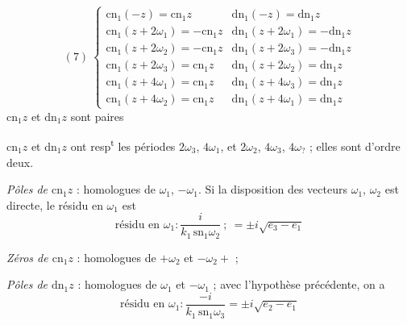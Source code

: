 \documentclass[11pt,a4paper]{article}
\begin{document}
\[
(7)\ \left\lbrace
\begin{array}{ll}
\mathrm{cn}_1(-z) = \mathrm{cn}_1 z & \mathrm{dn}_1(-z) = \mathrm{dn}_1 z\\[4pt]
\mathrm{cn}_1(z+2\omega_1) = -\mathrm{cn}_1 z & \mathrm{dn}_1(z+2\omega_1) = -\mathrm{dn}_1 z\\
\mathrm{cn}_1(z+2\omega_2) = -\mathrm{cn}_1 z & \mathrm{dn}_1(z+2\omega_3) = -\mathrm{dn}_1 z\\[4pt]
\mathrm{cn}_1(z+2\omega_3) = \mathrm{cn}_1 z & \mathrm{dn}_1(z+2\omega_2) = \mathrm{dn}_1 z\\
\mathrm{cn}_1(z+4\omega_1) = \mathrm{cn}_1 z & \mathrm{dn}_1(z+4\omega_3) = \mathrm{dn}_1 z\\
\mathrm{cn}_1(z+4\omega_2) = \mathrm{cn}_1 z & \mathrm{dn}_1(z+4\omega_1) = \mathrm{dn}_1 z
\end{array}
\right.
\]
$\mathrm{cn}_1 z$ et $\mathrm{dn}_1 z$ sont paires

$\mathrm{cn}_1 z$ et $\mathrm{dn}_1 z$ ont resp\textsuperscript{t} les périodes
$2\omega_3$, $4\omega_1$,  et $2\omega_2$, $4\omega_3$,
$4\omega_{?}$ ; elles sont d'ordre deux.

\emph{Pôles de $\mathrm{cn}_1 z$} : homologues de $\omega_1$,
   $-\omega_1$.
Si la disposition des vecteurs $\omega_1$, $\omega_2$ est directe, le résidu en
$\omega_1$ est
\[
\text{résidu en } \omega_1 : \frac{i}{k_1\,\mathrm{sn}_1\omega_2} \ ;\ = \pm i\sqrt{e_3-e_1}
\]

\emph{Zéros de $\mathrm{cn}_1 z$} : homologues de $+\omega_2$ et $-\omega_2 +$
 ;

\emph{Pôles de $\mathrm{dn}_1 z$} : homologues de $\omega_1$ et
$-\omega_1$ ; avec l'hypothèse précédente, on a
\[
\text{résidu en } \omega_1 : \frac{-i}{k_1\,\mathrm{sn}_1\omega_3} = \pm i\sqrt{e_2-e_1}
\]
\end{document}
